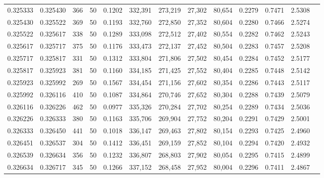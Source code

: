 \begin{tabular}{rrrrrrrrrrrrr}
0.325333 & 0.325430 &   366 &  50 &                                     0.1202 & 332,391 & 273,219 &  27,302 &  80,654 & 0.2279 & 0.7471 & 2.5308 \\
0.325430 & 0.325522 &   369 &  50 &                                     0.1193 & 332,760 & 272,850 &  27,352 &  80,604 & 0.2280 & 0.7466 & 2.5274 \\
0.325522 & 0.325617 &   338 &  50 &                                     0.1289 & 333,098 & 272,512 &  27,402 &  80,554 & 0.2282 & 0.7462 & 2.5243 \\
0.325617 & 0.325717 &   375 &  50 &                                     0.1176 & 333,473 & 272,137 &  27,452 &  80,504 & 0.2283 & 0.7457 & 2.5208 \\
0.325717 & 0.325817 &   331 &  50 &                                     0.1312 & 333,804 & 271,806 &  27,502 &  80,454 & 0.2284 & 0.7452 & 2.5177 \\
0.325817 & 0.325923 &   381 &  50 &                                     0.1160 & 334,185 & 271,425 &  27,552 &  80,404 & 0.2285 & 0.7448 & 2.5142 \\
0.325923 & 0.325992 &   269 &  50 &                                     0.1567 & 334,454 & 271,156 &  27,602 &  80,354 & 0.2286 & 0.7443 & 2.5117 \\
0.325992 & 0.326116 &   410 &  50 &                                     0.1087 & 334,864 & 270,746 &  27,652 &  80,304 & 0.2288 & 0.7439 & 2.5079 \\
0.326116 & 0.326226 &   462 &  50 &                                     0.0977 & 335,326 & 270,284 &  27,702 &  80,254 & 0.2289 & 0.7434 & 2.5036 \\
0.326226 & 0.326333 &   380 &  50 &                                     0.1163 & 335,706 & 269,904 &  27,752 &  80,204 & 0.2291 & 0.7429 & 2.5001 \\
0.326333 & 0.326450 &   441 &  50 &                                     0.1018 & 336,147 & 269,463 &  27,802 &  80,154 & 0.2293 & 0.7425 & 2.4960 \\
0.326451 & 0.326537 &   304 &  50 &                                     0.1412 & 336,451 & 269,159 &  27,852 &  80,104 & 0.2294 & 0.7420 & 2.4932 \\
0.326539 & 0.326634 &   356 &  50 &                                     0.1232 & 336,807 & 268,803 &  27,902 &  80,054 & 0.2295 & 0.7415 & 2.4899 \\
0.326634 & 0.326717 &   345 &  50 &                                     0.1266 & 337,152 & 268,458 &  27,952 &  80,004 & 0.2296 & 0.7411 & 2.4867 \\

\end{tabular}
